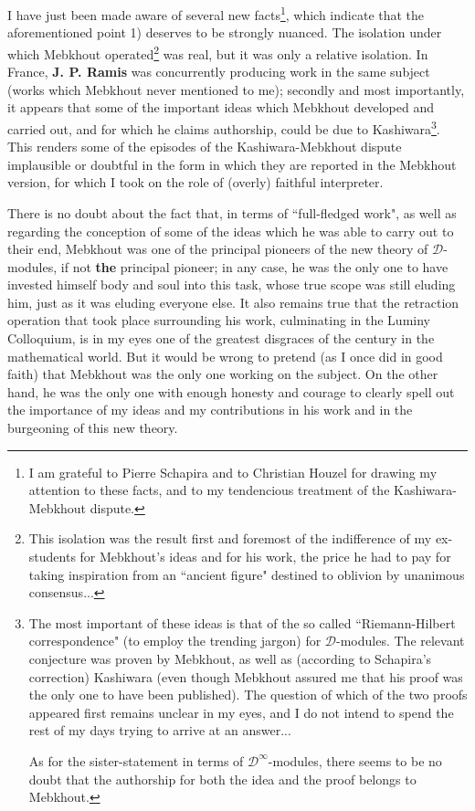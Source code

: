 I have just been made aware of several new facts\footnote{I am grateful to Pierre Schapira and to Christian Houzel for drawing my attention to these facts, and to my tendencious treatment of the Kashiwara-Mebkhout dispute.}, which indicate that the aforementioned point 1) deserves to be strongly nuanced. The isolation under which Mebkhout operated\footnote{This isolation was the result first and foremost of the indifference of my ex-students for Mebkhout's ideas and for his work, the price he had to pay for taking inspiration from an ``ancient figure" destined to oblivion by unanimous consensus...} was real, but it was only a relative isolation. In France, \textbf{J. P. Ramis} was concurrently producing work in the same subject (works which Mebkhout never mentioned to me); secondly and most importantly, it appears that some of the important ideas which Mebkhout developed and carried out, and for which he claims authorship, could be due to Kashiwara\footnote{The most important of these ideas is that of the so called ``Riemann-Hilbert correspondence" (to employ the trending jargon) for $\mathcal{D}$-modules. The relevant conjecture was proven by Mebkhout, as well as (according to Schapira's correction) Kashiwara (even though Mebkhout assured me that his proof was the only one to have been published). The question of which of the two proofs appeared first remains unclear in my eyes, and I do not intend to spend the rest of my days trying to arrive at an answer...

As for the sister-statement in terms of $\mathcal{D}^{\infty}$-modules, there seems to be no doubt that the authorship for both the idea and the proof belongs to Mebkhout.}. This renders some of the episodes of the Kashiwara-Mebkhout dispute implausible or doubtful in the form in which they are reported in the Mebkhout version, for which I took on the role of (overly) faithful interpreter.

There is no doubt about the fact that, in terms of ``full-fledged work", as well as regarding the conception of some of the ideas which he was able to carry out to their end, Mebkhout was one of the principal pioneers of the new theory of $\mathcal{D}$-modules, if not \textbf{the} principal pioneer; in any case, he was the only one to have invested himself body and soul into this task, whose true scope was still eluding him, just as it was eluding everyone else. It also remains true that the retraction operation that took place surrounding his work, culminating in the Luminy Colloquium, is in my eyes one of the greatest disgraces of the century in the mathematical world. But it would be wrong to pretend (as I once did in good faith) that Mebkhout was the only one working on the subject. On the other hand, he was the only one with enough honesty and courage to clearly spell out the importance of my ideas and my contributions in his work and in the burgeoning of this new theory.

